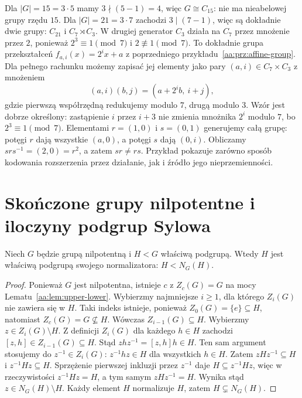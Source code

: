 \begin{przyklad}
Dla $|G|=15=3\cdot5$ mamy $3\nmid(5-1)=4$,
więc $G\cong C_{15}$: nie ma nieabelowej grupy rzędu $15$.
Dla $|G|=21=3\cdot7$ zachodzi $3\mid(7-1)$,
więc są dokładnie dwie grupy: $C_{21}$ i
$C_7\rtimes C_3$. W drugiej generator $C_3$ działa
na $C_7$ przez mnożenie przez $2$, ponieważ
$2^3\equiv1\pmod7$ i $2\not\equiv1\pmod7$.
To dokładnie grupa przekształceń $f_{a,i}(x)=2^i x+a$
z poprzedniego przykładu~\ref{aa:prz:affine-group}.
Dla pełnego rachunku możemy zapisać jej elementy jako
pary $(a,i)\in C_7\times C_3$ z mnożeniem
\[
 (a,i)(b,j)=(a+2^i b,\ i+j),
\]
gdzie pierwszą współrzędną redukujemy modulo $7$, drugą
modulo $3$. Wzór jest dobrze określony: zastąpienie
$i$ przez $i+3$ nie zmienia mnożnika $2^i$ modulo $7$,
bo $2^3\equiv1\pmod 7$. Elementami $r=(1,0)$
i $s=(0,1)$ generujemy całą grupę: potęgi $r$ dają
wszystkie $(a,0)$, a potęgi $s$ dają $(0,i)$.
Obliczamy $srs^{-1}=(2,0)=r^2$, a zatem
$sr\ne rs$. Przykład pokazuje zarówno sposób kodowania
rozszerzenia przez działanie, jak i źródło jego nieprzemienności.
\end{przyklad}

\section{Skończone grupy nilpotentne i iloczyny podgrup Sylowa}
\begin{lemat}
\label{aa:lem:nilpotent-normalizer}
Niech $G$ będzie grupą nilpotentną i $H<G$ właściwą
podgrupą. Wtedy $H$ jest właściwą podgrupą swojego
normalizatora: $H<N_G(H)$.
\end{lemat}
\begin{proof}
Ponieważ $G$ jest nilpotentna, istnieje $c$ z $Z_c(G)=G$
na mocy Lematu~\ref{aa:lem:upper-lower}.
Wybierzmy najmniejsze $i\ge1$, dla którego $Z_i(G)$
nie zawiera się w $H$. Taki indeks istnieje, ponieważ
$Z_0(G)=\{e\}\subseteq H$, natomiast $Z_c(G)=G\nsubseteq H$.
Wówczas $Z_{i-1}(G)\subseteq H$.
Wybierzmy $z\in Z_i(G)\setminus H$.
Z definicji $Z_i(G)$ dla każdego $h\in H$ zachodzi
$[z,h]\in Z_{i-1}(G)\subseteq H$.
Stąd $zhz^{-1}=[z,h]h\in H$.
Ten sam argument stosujemy do $z^{-1}\in Z_i(G)$:
$z^{-1}hz\in H$ dla wszystkich $h\in H$.
Zatem $zHz^{-1}\subseteq H$ i $z^{-1}Hz\subseteq H$.
Sprzężenie pierwszej inkluzji przez $z^{-1}$ daje
$H\subseteq z^{-1}Hz$, więc w rzeczywistości
$z^{-1}Hz=H$, a tym samym $zHz^{-1}=H$.
Wynika stąd $z\in N_G(H)\setminus H$.
Każdy element $H$ normalizuje $H$, zatem
$H\subsetneq N_G(H)$.
\end{proof}


